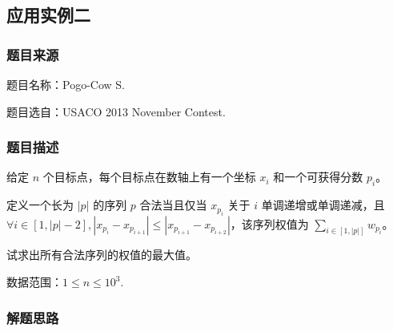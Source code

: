 \begin{Shaded}
\begin{Highlighting}[]
            \OperatorTok{(}\OperatorTok{\textless{}=}\OperatorTok{\&\&(}\OperatorTok{[}\OperatorTok{[}\OperatorTok{]]\textgreater{}}\OperatorTok{[}\OperatorTok{]||(}\OperatorTok{[}\OperatorTok{[}\OperatorTok{]]==}\OperatorTok{[}\OperatorTok{]\&\&}\OperatorTok{[}\OperatorTok{[}\OperatorTok{]]\textless{}=}\OperatorTok{[}\OperatorTok{])))}\OperatorTok{{-}{-};}
\OperatorTok{[++}\OperatorTok{]=}\OperatorTok{;}
        \OperatorTok{\}}
\OperatorTok{(}\OperatorTok{,}\OperatorTok{[}\OperatorTok{]);}
    \OperatorTok{\}}
     \OperatorTok{;}
\OperatorTok{\}}
\end{Highlighting}
\end{Shaded}

\subsection{应用实例二}

\subsubsection{题目来源}

题目名称：Pogo-Cow S.

题目选自：USACO 2013 November Contest.

\subsubsection{题目描述}

给定 \(n\) 个目标点，每个目标点在数轴上有一个坐标 \(x_i\)
和一个可获得分数 \(p_i\)。

定义一个长为 \(|p|\) 的序列 \(p\) 合法当且仅当 \(x_{p_i}\) 关于 \(i\)
单调递增或单调递减，且
\(\forall i\in[1,|p|-2],|x_{p_i}-x_{p_{i+1}}|\le |x_{p_{i+1}}-x_{p_{i+2}}|\)，该序列权值为
\(\sum_{i\in[1,|p|]}w_{p_i}\)。

试求出所有合法序列的权值的最大值。

数据范围：\(1\le n\le 10^3\).

\subsubsection{解题思路}

